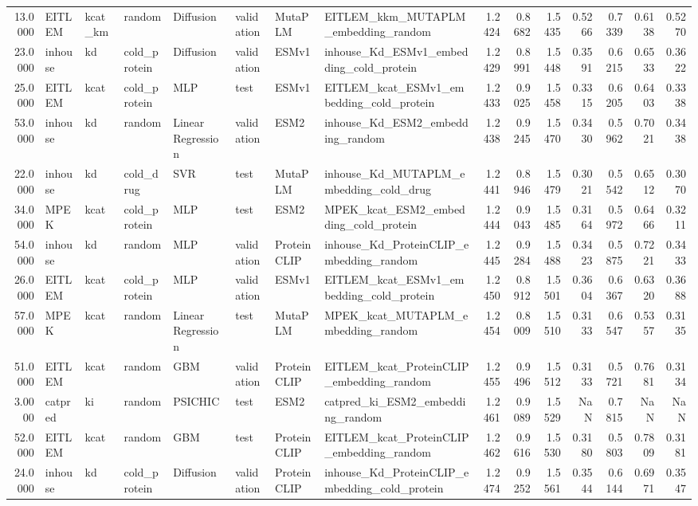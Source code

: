 \begin{tabular}{rlllllllrrrrrrr}
13.0000 & EITLEM & kcat_km & random & Diffusion & validation & MutaPLM & EITLEM_kkm_MUTAPLM_embedding_random & 1.2424 & 0.8682 & 1.5435 & 0.5266 & 0.7339 & 0.6138 & 0.5270 \\
23.0000 & inhouse & kd & cold_protein & Diffusion & validation & ESMv1 & inhouse_Kd_ESMv1_embedding_cold_protein & 1.2429 & 0.8991 & 1.5448 & 0.3591 & 0.6215 & 0.6533 & 0.3622 \\
25.0000 & EITLEM & kcat & cold_protein & MLP & test & ESMv1 & EITLEM_kcat_ESMv1_embedding_cold_protein & 1.2433 & 0.9025 & 1.5458 & 0.3315 & 0.6205 & 0.6403 & 0.3338 \\
53.0000 & inhouse & kd & random & Linear Regression & validation & ESM2 & inhouse_Kd_ESM2_embedding_random & 1.2438 & 0.9245 & 1.5470 & 0.3430 & 0.5962 & 0.7021 & 0.3438 \\
22.0000 & inhouse & kd & cold_drug & SVR & test & MutaPLM & inhouse_Kd_MUTAPLM_embedding_cold_drug & 1.2441 & 0.8946 & 1.5479 & 0.3021 & 0.5542 & 0.6512 & 0.3070 \\
34.0000 & MPEK & kcat & cold_protein & MLP & test & ESM2 & MPEK_kcat_ESM2_embedding_cold_protein & 1.2444 & 0.9043 & 1.5485 & 0.3164 & 0.5972 & 0.6466 & 0.3211 \\
54.0000 & inhouse & kd & random & MLP & validation & ProteinCLIP & inhouse_Kd_ProteinCLIP_embedding_random & 1.2445 & 0.9284 & 1.5488 & 0.3423 & 0.5875 & 0.7221 & 0.3433 \\
26.0000 & EITLEM & kcat & cold_protein & MLP & validation & ESMv1 & EITLEM_kcat_ESMv1_embedding_cold_protein & 1.2450 & 0.8912 & 1.5501 & 0.3604 & 0.6367 & 0.6320 & 0.3688 \\
57.0000 & MPEK & kcat & random & Linear Regression & test & MutaPLM & MPEK_kcat_MUTAPLM_embedding_random & 1.2454 & 0.8009 & 1.5510 & 0.3133 & 0.6547 & 0.5357 & 0.3135 \\
51.0000 & EITLEM & kcat & random & GBM & validation & ProteinCLIP & EITLEM_kcat_ProteinCLIP_embedding_random & 1.2455 & 0.9496 & 1.5512 & 0.3133 & 0.5721 & 0.7681 & 0.3134 \\
3.0000 & catpred & ki & random & PSICHIC & test & ESM2 & catpred_ki_ESM2_embedding_random & 1.2461 & 0.9089 & 1.5529 & NaN & 0.7815 & NaN & NaN \\
52.0000 & EITLEM & kcat & random & GBM & test & ProteinCLIP & EITLEM_kcat_ProteinCLIP_embedding_random & 1.2462 & 0.9616 & 1.5530 & 0.3180 & 0.5803 & 0.7809 & 0.3181 \\
24.0000 & inhouse & kd & cold_protein & Diffusion & validation & ProteinCLIP & inhouse_Kd_ProteinCLIP_embedding_cold_protein & 1.2474 & 0.9252 & 1.5561 & 0.3544 & 0.6144 & 0.6971 & 0.3547 \\

\end{tabular}
